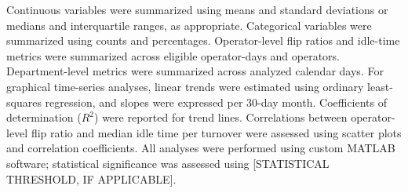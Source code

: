 \documentclass[12pt]{article}
\begin{document}
Continuous variables were summarized using means and standard deviations or medians and interquartile ranges, as appropriate. Categorical variables were summarized using counts and percentages. Operator-level flip ratios and idle-time metrics were summarized across eligible operator-days and operators. Department-level metrics were summarized across analyzed calendar days. For graphical time-series analyses, linear trends were estimated using ordinary least-squares regression, and slopes were expressed per 30-day month. Coefficients of determination ($R^2$) were reported for trend lines. Correlations between operator-level flip ratio and median idle time per turnover were assessed using scatter plots and correlation coefficients. All analyses were performed using custom MATLAB software; statistical significance was assessed using [STATISTICAL THRESHOLD, IF APPLICABLE].
\end{document}
